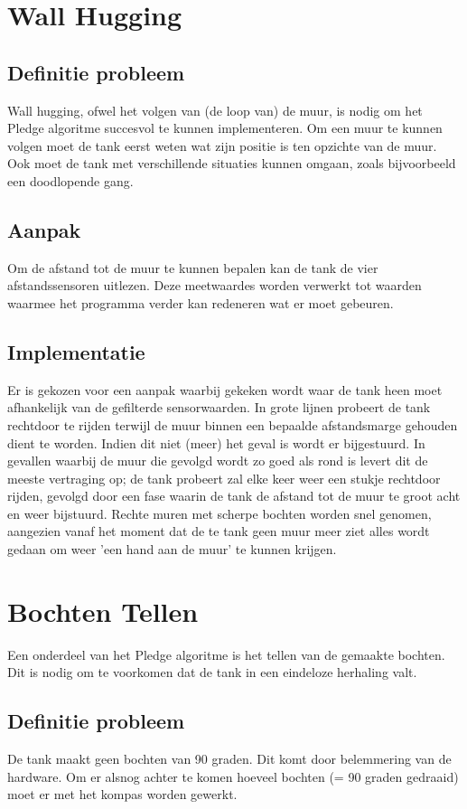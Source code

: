 \documentclass{report}
\begin{document}
\chapter{Wall Hugging}
\label{chap:wall_hugging}
\section{Definitie probleem}
Wall hugging, ofwel het volgen van (de loop van) de muur, is nodig om het Pledge algoritme succesvol te kunnen implementeren. Om een muur te kunnen volgen moet de tank eerst weten wat zijn positie is ten opzichte van de muur. Ook moet de tank met verschillende situaties kunnen omgaan, zoals bijvoorbeeld een doodlopende gang.
\section{Aanpak}
Om de afstand tot de muur te kunnen bepalen kan de tank de vier afstandssensoren uitlezen. Deze meetwaardes worden verwerkt tot waarden waarmee het programma verder kan redeneren wat er moet gebeuren. 
\section{Implementatie}
Er is gekozen voor een aanpak waarbij gekeken wordt waar de tank heen moet afhankelijk van de gefilterde sensorwaarden. In grote lijnen probeert de tank rechtdoor te rijden terwijl de muur binnen een bepaalde afstandsmarge gehouden dient te worden. Indien dit niet (meer) het geval is wordt er bijgestuurd. In gevallen waarbij de muur die gevolgd wordt zo goed als rond is levert dit de meeste vertraging op; de tank probeert zal elke keer weer een stukje rechtdoor rijden, gevolgd door een fase waarin de tank de afstand tot de muur te groot acht en weer bijstuurd. Rechte muren met scherpe bochten worden snel genomen, aangezien vanaf het moment dat de te tank geen muur meer ziet alles wordt gedaan om weer 'een hand aan de muur' te kunnen krijgen.

\chapter{Bochten Tellen}
\label{chap:bochten_tellen}
Een onderdeel van het Pledge algoritme is het tellen van de gemaakte bochten. Dit is nodig om te voorkomen dat de tank in een eindeloze herhaling valt.
\section{Definitie probleem}
De tank maakt geen bochten van 90 graden. Dit komt door belemmering van de hardware. Om er alsnog achter te komen hoeveel bochten (= 90 graden gedraaid) moet er met het kompas worden gewerkt.
\end{document}
